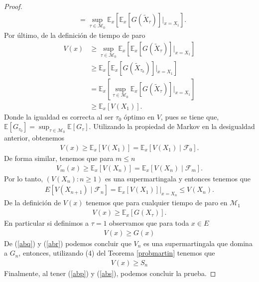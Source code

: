 \begin{proof}
\begin{align*}
	& = \sup_{\tau \in \mathcal{M}_0} \mathbb{E}_x \left[ \mathbb{E}_x [G(\tilde{X}_\tau)] \bigg|_{x= X_1} \right].
	\end{align*}
Por último, de la definición de tiempo de paro
	\begin{align*}
	V (x) & \geq \sup_{\tau \in \mathcal{M}_0} \mathbb{E}_x \left[ \mathbb{E}_x [G(\tilde{X}_\tau)] \bigg|_{x= X_1} \right] \\
	& \geq \mathbb{E}_x \left[ \mathbb{E}_x [G(\tilde{X}_{\tau_0})]\bigg|_{x= X_1} \right] \\
	& = \mathbb{E}_x \left[ \sup_{\tau \in \mathcal{M}_0} \mathbb{E}_x[ G(\tilde{X}_\tau)]  \bigg|_{x= X_1} \right] \\
	& \geq \mathbb{E}_x [V(X_1)].
	\end{align*}
Donde la igualdad es correcta al ser $\tau_0$ óptimo en $V$, pues se tiene que, $\mathbb{E}[G_{\tau_0}] = \sup_{\tau \in \mathcal{M}_0} \mathbb{E}[G_{\tau}]$. Utilizando la propiedad de Markov en la desigualdad anterior, obtenemos 
	\begin{align*}
	V (x) \geq \mathbb{E}_x [V(X_1)] = \mathbb{E}_x [V(X_1) \mid \mathcal{F}_0].
	\end{align*}
De forma similar, tenemos que para $m \leq n$
	\begin{align*}
	V_m (x) \geq \mathbb{E}_x [V(X_n)] = \mathbb{E}_x [V(X_n) \mid \mathcal{F}_m].
	\end{align*}
Por lo tanto, $(V(X_n) : n \geq 1)$ es una supermartingala y entonces tenemos que
	\begin{align}
	E[V(X_{n+1}) \mid \mathcal{F}_n] = \mathbb{E}_x [V(X_1)] \bigg|_{x = X_n} \leq V(X_n). \label{abq}
	\end{align}
De la definición de $V(x)$ tenemos que para cualquier tiempo de paro en $\mathcal{M}_1$
	\begin{align*}
	V(x) \geq \mathbb{E}_x [G(X_\tau)].
	\end{align*}
En particular si definimos a $\tau = 1$ observamos que para toda $x \in E$
	\begin{align}
	V(x) \geq G(x) \label{abr}
	\end{align}
De (\ref{abq}) y (\ref{abr}) podemos concluir que $V_n$ es una supermartingala que domina a $G_n$, entonces, utilizando (4) del Teorema \ref{probmartin} tenemos que
	\begin{align}
	V(x) \geq S_n \label{abs}
	\end{align}
Finalmente, al tener (\ref{abp}) y (\ref{abs}), podemos concluir la prueba.
\end{proof}


